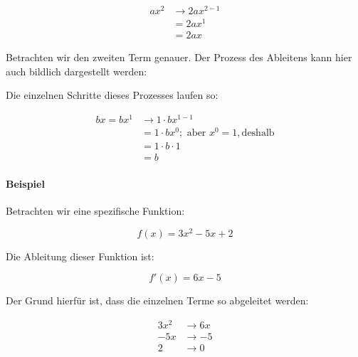 \documentclass{scrartcl}
\begin{document}
\begin{align}
    a x^2 & \rightarrow 2 a x^{2 - 1}\\
    & = 2 a x^1\\
    & = 2 a x
\end{align}

Betrachten wir den zweiten Term genauer.  Der Prozess des Ableitens kann
hier auch bildlich dargestellt werden:

\begin{center}
\end{center}

Die einzelnen Schritte dieses Prozesses laufen so:

\begin{align}
    b x = b x^1 & \rightarrow 1 \cdot b x^{1 - 1}\\
    & = 1 \cdot b x^0; \text{ aber } x^0 = 1, \text{deshalb}\\
    & = 1 \cdot b \cdot 1\\
    & = b
\end{align}

\paragraph{Beispiel} Betrachten wir eine spezifische Funktion:

\begin{equation}
    f(x) = 3x^2 - 5x + 2
\end{equation}

Die Ableitung dieser Funktion ist:

\begin{equation}
    f'(x) = 6x - 5
\end{equation}

Der Grund hierfür ist, dass die einzelnen Terme so abgeleitet werden:

\begin{align}
    3x^2 & \rightarrow 6x\\
    -5x & \rightarrow -5\\
    2 & \rightarrow 0
\end{align}
\end{document}
